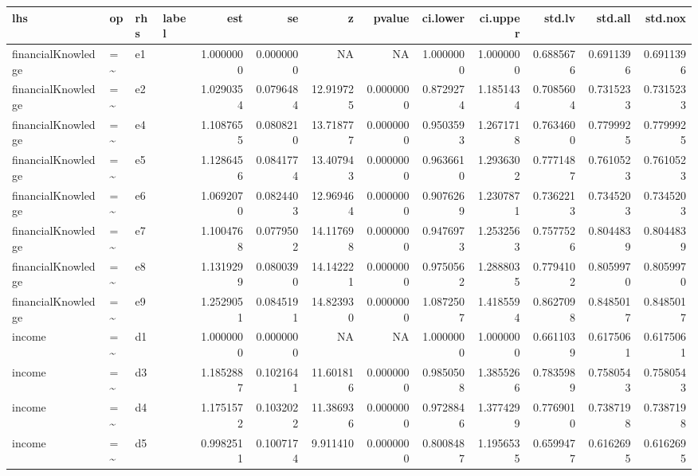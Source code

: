 \documentclass[
  super,
  preprint,
  3p]{elsarticle}
\begin{document}
\begin{tabular}{l|l|l|l|r|r|r|r|r|r|r|r|r}
\hline
lhs & op & rhs & label & est & se & z & pvalue & ci.lower & ci.upper & std.lv & std.all & std.nox\\
\hline
financialKnowledge & =\textasciitilde{} & e1 &  & 1.0000000 & 0.0000000 & NA & NA & 1.0000000 & 1.0000000 & 0.6885676 & 0.6911396 & 0.6911396\\
\hline
financialKnowledge & =\textasciitilde{} & e2 &  & 1.0290354 & 0.0796484 & 12.919725 & 0.0000000 & 0.8729274 & 1.1851434 & 0.7085604 & 0.7315233 & 0.7315233\\
\hline
financialKnowledge & =\textasciitilde{} & e4 &  & 1.1087655 & 0.0808210 & 13.718777 & 0.0000000 & 0.9503593 & 1.2671718 & 0.7634600 & 0.7799925 & 0.7799925\\
\hline
financialKnowledge & =\textasciitilde{} & e5 &  & 1.1286456 & 0.0841774 & 13.407943 & 0.0000000 & 0.9636610 & 1.2936302 & 0.7771487 & 0.7610523 & 0.7610523\\
\hline
financialKnowledge & =\textasciitilde{} & e6 &  & 1.0692070 & 0.0824403 & 12.969464 & 0.0000000 & 0.9076269 & 1.2307871 & 0.7362213 & 0.7345203 & 0.7345203\\
\hline
financialKnowledge & =\textasciitilde{} & e7 &  & 1.1004768 & 0.0779502 & 14.117698 & 0.0000000 & 0.9476973 & 1.2532563 & 0.7577526 & 0.8044839 & 0.8044839\\
\hline
financialKnowledge & =\textasciitilde{} & e8 &  & 1.1319299 & 0.0800390 & 14.142221 & 0.0000000 & 0.9750562 & 1.2888035 & 0.7794102 & 0.8059970 & 0.8059970\\
\hline
financialKnowledge & =\textasciitilde{} & e9 &  & 1.2529051 & 0.0845191 & 14.823930 & 0.0000000 & 1.0872507 & 1.4185594 & 0.8627098 & 0.8485017 & 0.8485017\\
\hline
income & =\textasciitilde{} & d1 &  & 1.0000000 & 0.0000000 & NA & NA & 1.0000000 & 1.0000000 & 0.6611039 & 0.6175061 & 0.6175061\\
\hline
income & =\textasciitilde{} & d3 &  & 1.1852887 & 0.1021641 & 11.601816 & 0.0000000 & 0.9850508 & 1.3855266 & 0.7835989 & 0.7580543 & 0.7580543\\
\hline
income & =\textasciitilde{} & d4 &  & 1.1751572 & 0.1032022 & 11.386936 & 0.0000000 & 0.9728846 & 1.3774299 & 0.7769010 & 0.7387198 & 0.7387198\\
\hline
income & =\textasciitilde{} & d5 &  & 0.9982511 & 0.1007174 & 9.911410 & 0.0000000 & 0.8008487 & 1.1956535 & 0.6599477 & 0.6162695 & 0.6162695\\

\end{tabular}
\end{document}
